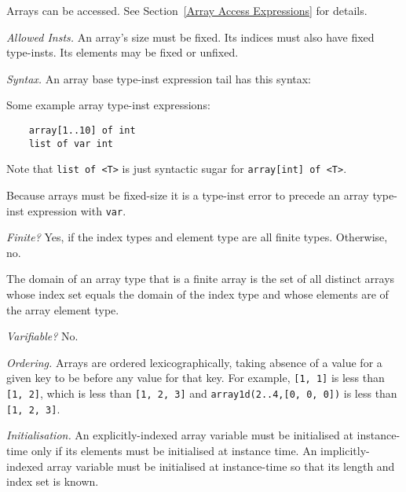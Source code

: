 \documentclass[10pt]{scrartcl}
\newcommand{\pjs}[1]{\textcolor{blue}{PJS:#1}}
\newcommand{\TyThing}[1]{\vspace{1.2mm}\noindent\emph{#1} }
\newcommand{\TyInsts}{\TyThing{Allowed Insts.}}
\newcommand{\TySyntax}{\TyThing{Syntax.}}
\newcommand{\TyFiniteType}{\TyThing{Finite?}}
\newcommand{\TyVarifiable}{\TyThing{Varifiable?}}
\newcommand{\TyOrdering}{\TyThing{Ordering.}}
\newcommand{\TyInit}{\TyThing{Initialisation.}}
\begin{document}
Arrays can be accessed.  See Section~\ref{Array Access Expressions} for
details.

\TyInsts
An array's size must be fixed.  Its indices must also have
fixed type-insts.  Its elements may be fixed or unfixed.

\TySyntax
An array base type-inst expression tail has this syntax:
\begin{productions}
    \RuleArrayTIExprTail
\end{productions}
Some example array type-inst expressions:
\begin{verbatim}
    array[1..10] of int
    list of var int
\end{verbatim}
Note that \texttt{list of <T>} is just syntactic sugar for
\texttt{array[int] of <T>}.  

Because arrays must be fixed-size it is a type-inst error to precede an
array type-inst expression with \texttt{var}.


\TyFiniteType
Yes, if the index types and element type are all finite types.
Otherwise, no.

The domain of an array type that is a finite array is the set of all
distinct arrays whose index set equals the domain of the index type
and whose elements are of the array element type.

\TyVarifiable
No.

\TyOrdering
Arrays are ordered lexicographically, taking absence of a value for a given key
to be before any value for that key.  For example,
\texttt{[1, 1]} is less than
\texttt{[1, 2]}, which is less than \texttt{[1, 2, 3]} and
\texttt{array1d(2..4,[0, 0, 0])} is less than \texttt{[1, 2, 3]}.

\TyInit
An explicitly-indexed array variable must be initialised at instance-time
only if its elements must be initialised at instance time.
An implicitly-indexed array variable must be initialised at instance-time
so that its length and index set is known.
\end{document}
